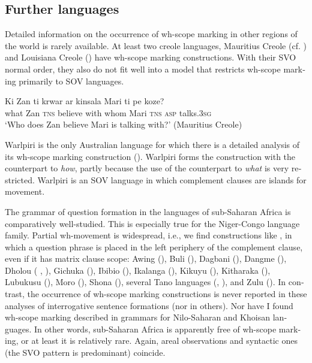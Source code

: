 \documentclass[output=paper,colorlinks,citecolor=brown]{langscibook}
\begin{document}
\begin{otherlanguage}{english}
\section{Further languages} \label{further:languages}

Detailed information on the occurrence of wh-scope marking in other regions of the world is rarely available. At least two creole languages, Mauritius Creole  (cf. \citealt[82]{Adone-Vainikka1999}) and Louisiana Creole (\citealt{Brandt2020}) have wh-scope marking constructions. With their SVO normal order, they also do not fit well into a model that restricts wh-scope marking primarily to SOV languages.

\ea 
\gll    Ki 	    Zan ti 		       krwar 		ar 	    kinsala Mari ti 	pe 	koze?   \\
        what	Zan \textsc{tns}	believe 	with 	whom  Mari \textsc{tns} \textsc{asp}	talks.3\textsc{sg}  \\
    \glt    ‘Who does Zan believe Mari is talking with?' \hfill (Mauritius Creole)\label{ex:fanselow:44}
    \z

\noindent Warlpiri is the only Australian language for which there is a detailed analysis of its wh-scope marking construction (\citealt{Legate2011}). Warlpiri forms the construction with the counterpart to \textit{how}, partly because the use of the counterpart to \textit{what} is very restricted. Warlpiri is an SOV language in which complement clauses are islands for movement.

The grammar of question formation in the languages of sub-Saharan Africa is comparatively well-studied. This is especially true for the Niger-Congo language family. Partial wh-movement is widespread, i.e., we find constructions like , in which a question phrase is placed in the left periphery of the complement clause, even if it has matrix clause scope: Awing (\citealt{Fominyam2021}), Buli (\citealt{Ferreira-Ko2000}), Dagbani (\citealt{Issah2013}), Dangme (\citealt{Caesar2016}), Dholou (\citeauthor{Schardl2013} \citeyear{Schardl2012}, \citeyear{Schardl2013}), Gichuka (\citealt{Muriungi-Mutegi-etal2014}), Ibibio (\citealt{Doherty2016}), Ikalanga (\citealt{Letsholo2006}), Kikuyu (\citealt{Sabel2000}), Kitharaka (\citealt{Muriungi2005}), Lubukusu (\citealt{Wasike2006}), Moro (\citealt{Rohde2006}), Shona (\citealt{Zentz2016}), several Tano languages (\citealt{Kandybowicz-Torrence2015}, \citealt{Torrence-Kandybowicz2013}), and Zulu (\citealt{Sabel-Zeller2006}). In contrast, the occurrence of wh-scope marking constructions is never reported in these analyses of interrogative sentence formations (nor in others). Nor have I found wh-scope marking described in grammars for Nilo-Saharan and Khoisan languages. In other words, sub-Saharan Africa is apparently free of wh-scope marking, or at least it is relatively rare. Again, areal observations and syntactic ones (the SVO pattern is predominant) coincide.


\end{otherlanguage}
\end{document}
